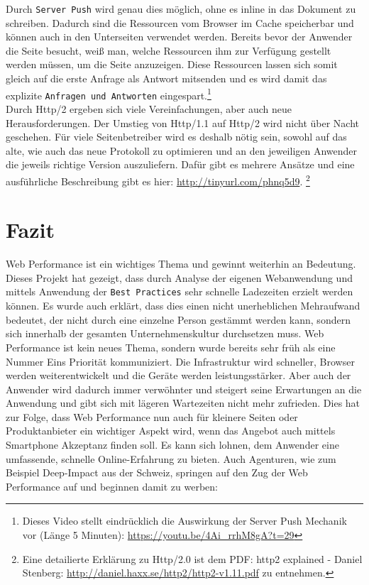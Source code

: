 			Durch \texttt{Server Push} wird genau dies möglich, ohne es inline in das Dokument zu schreiben. Dadurch sind die Ressourcen vom Browser im Cache speicherbar und können auch in den Unterseiten verwendet werden. Bereits bevor der Anwender die Seite besucht, weiß man, welche Ressourcen ihm zur Verfügung gestellt werden müssen, um die Seite anzuzeigen. Diese Ressourcen lassen sich somit gleich auf die erste Anfrage als Antwort mitsenden und es wird damit das explizite \texttt{Anfragen und Antworten} eingespart.\footnote{Dieses Video stellt eindrücklich die Auswirkung der Server Push Mechanik vor (Länge 5 Minuten): \url{https://youtu.be/4Ai_rrhM8gA?t=29}}\\

			Durch Http/2 ergeben sich viele Vereinfachungen, aber auch neue Herausforderungen. Der Umstieg von Http/1.1 auf Http/2 wird nicht über Nacht geschehen. Für viele Seitenbetreiber wird es deshalb nötig sein, sowohl auf das alte, wie auch das neue Protokoll zu optimieren und an den jeweiligen Anwender die jeweils richtige Version auszuliefern. Dafür gibt es mehrere Ansätze und eine ausführliche Beschreibung gibt es hier: \url{http://tinyurl.com/phnq5d9}. \footnote{Eine detailierte Erklärung zu Http/2.0 ist dem PDF: http2 explained - Daniel Stenberg: \url{http://daniel.haxx.se/http2/http2-v1.11.pdf} zu entnehmen.}



\pagebreak
%
%


\section{Fazit} %
\label{sec:fazit}
	Web Performance ist ein wichtiges Thema und gewinnt weiterhin an Bedeutung. Dieses Projekt hat gezeigt, dass durch Analyse der eigenen Webanwendung und mittels Anwendung der \texttt{Best Practices} sehr schnelle Ladezeiten erzielt werden können. Es wurde auch erklärt, dass dies einen nicht unerheblichen Mehraufwand bedeutet, der nicht durch eine einzelne Person gestämmt werden kann, sondern sich innerhalb der gesamten Unternehmenskultur durchsetzen muss. Web Performance ist kein neues Thema, sondern wurde bereits sehr früh als eine Nummer Eins Priorität kommuniziert. Die Infrastruktur wird schneller, Browser werden weiterentwickelt und die Geräte werden leistungsstärker. Aber auch der Anwender wird dadurch immer verwöhnter und steigert seine Erwartungen an die Anwendung und gibt sich mit lägeren Wartezeiten nicht mehr zufrieden. Dies hat zur Folge, dass Web Performance nun auch für kleinere Seiten oder Produktanbieter ein wichtiger Aspekt wird, wenn das Angebot auch mittels Smartphone Akzeptanz finden soll. Es kann sich lohnen, dem Anwender eine umfassende, schnelle Online-Erfahrung zu bieten. Auch Agenturen, wie zum Beispiel Deep-Impact aus der Schweiz, springen auf den Zug der Web Performance auf und beginnen damit zu werben:

